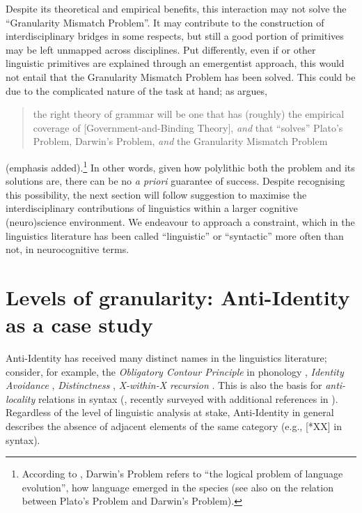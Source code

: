 \documentclass[output=paper]{langsci/langscibook}
\begin{document}
Despite its theoretical and empirical benefits, this interaction may not solve
the \enquote{Granularity Mismatch Problem}. It may contribute to the
construction of interdisciplinary bridges in some respects, but still a good
portion of primitives may be left unmapped across disciplines. Put differently,
even if  or other linguistic primitives are explained through an
emergentist approach, this would not entail that the Granularity Mismatch
Problem has been solved. This could be due to the complicated nature of the
task at hand; as \citet[156--157]{Hornstein2009} argues, \blockquote{the right
    theory of grammar will be one that has (roughly) the empirical coverage of
    [Government-and-Binding Theory], \emph{and} that \enquote{solves} Plato’s
    Problem, Darwin’s Problem, \emph{and} the Granularity Mismatch Problem}
    (emphasis added).\footnote{According to \citet{Hornstein2009}, Darwin’s
    Problem refers to “the logical problem of language evolution”, how language
emerged in the species (see also \citealt{BoeGro2007} on the relation between
Plato’s Problem and Darwin’s Problem).} In other words, given how polylithic
both the problem and its solutions are, there can be no \emph{a priori}
guarantee of success.  Despite recognising this possibility, the next section
will follow  suggestion to maximise the interdisciplinary
contributions of linguistics within a larger cognitive (neuro)science
environment. We endeavour to approach a constraint, which in the linguistics
literature has been called \enquote{linguistic} or \enquote{syntactic} more
often than not, in neurocognitive terms.

\section{Levels of granularity: Anti-Identity as a case study}\label{sec:key:3}

Anti-Identity has received many distinct names in the linguistics literature;
consider, for example, the \emph{Obligatory Contour Principle} in phonology
\citep{Odden1986}, \emph{Identity Avoidance} \parencite{vanRiemsdijk2008},
\emph{Distinctness} \citep{Richards2010}, \emph{X-within-X recursion}
\parencite{ArsHin2012}. This is also the basis for \emph{anti-locality}
relations in syntax (\citealt{Grohmann2003}, recently surveyed with additional
references in \citealt{Grohmann2011}). Regardless of the level of linguistic
analysis at stake, Anti-Identity in general describes the absence of adjacent
elements of the same category (e.g., [*XX] in syntax).
\end{document}
